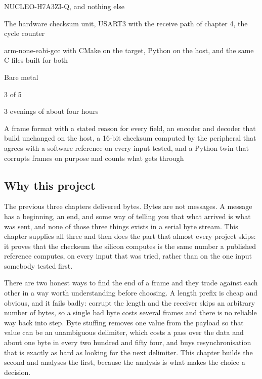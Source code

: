 
\begin{keyfacts}
\item[Board] NUCLEO-H7A3ZI-Q, and nothing else
\item[Peripherals] The hardware checksum unit, USART3 with the receive path of chapter 4, the cycle counter
\item[Toolchain] arm-none-eabi-gcc with CMake on the target, Python on the host, and the same C files built for both
\item[Operating system] Bare metal
\item[Difficulty] 3 of 5
\item[Effort] 3 evenings of about four hours
\item[Deliverable] A frame format with a stated reason for every field, an encoder and decoder that build unchanged on the host, a 16-bit checksum computed by the peripheral that agrees with a software reference on every input tested, and a Python twin that corrupts frames on purpose and counts what gets through
\end{keyfacts}

\subsection*{Why this project}

The previous three chapters delivered bytes. Bytes are not messages. A message
has a beginning, an end, and some way of telling you that what arrived is what
was sent, and none of those three things exists in a serial byte stream. This
chapter supplies all three and then does the part that almost every project
skips: it proves that the checksum the silicon computes is the same number a
published reference computes, on every input that was tried, rather than on the
one input somebody tested first.

There are two honest ways to find the end of a frame and they trade against each
other in a way worth understanding before choosing. A length prefix is cheap and
obvious, and it fails badly: corrupt the length and the receiver skips an
arbitrary number of bytes, so a single bad byte costs several frames and there
is no reliable way back into step. Byte stuffing removes one value from the
payload so that value can be an unambiguous delimiter, which costs a pass over
the data and about one byte in every two hundred and fifty four, and buys
resynchronisation that is exactly as hard as looking for the next delimiter.
This chapter builds the second and analyses the first, because the analysis is
what makes the choice a decision.

